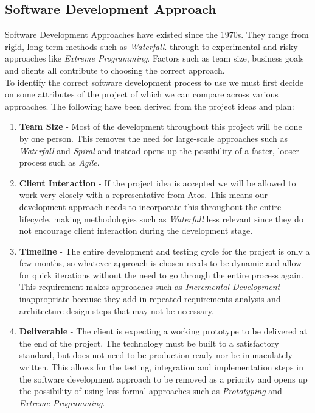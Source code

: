 \subsection{Software Development Approach}
Software Development Approaches have existed since the 1970s. They range from rigid, long-term methods such as \emph{Waterfall}. through to experimental and risky approaches like \emph{Extreme Programming}. Factors such as team size, business goals and clients all contribute to choosing the correct approach.\\
To identify the correct software development process to use we must first decide on some attributes of the project of which we can compare across various approaches. The following have been derived from the project ideas and plan:

\begin{enumerate}
  \item \textbf{Team Size} -
    Most of the development throughout this project will be done by one person. This removes the need for large-scale approaches such as \emph{Waterfall} and \emph{Spiral} and instead opens up the possibility of a faster, looser process such as \emph{Agile}.
  \item \textbf{Client Interaction} - 
    If the project idea is accepted we will be allowed to work very closely with a representative from Atos. This means our development approach needs to incorporate this throughout the entire lifecycle, making methodologies such as \emph{Waterfall} less relevant since they do not encourage client interaction during the development stage.
  \item \textbf{Timeline} - 
    The entire development and testing cycle for the project is only a few months, so whatever approach is chosen needs to be dynamic and allow for quick iterations without the need to go through the entire process again. This requirement makes approaches such as \emph{Incremental Development} inappropriate because they add in repeated requirements analysis and architecture design steps that may not be necessary.
  \item \textbf{Deliverable} -
    The client is expecting a working prototype to be delivered at the end of the project. The technology must be built to a satisfactory standard, but does not need to be production-ready nor be immaculately written. This allows for the testing, integration and implementation steps in the software development approach to be removed as a priority and opens up the possibility of using less formal approaches such as \emph{Prototyping} and \emph{Extreme Programming}.
\end{enumerate}
